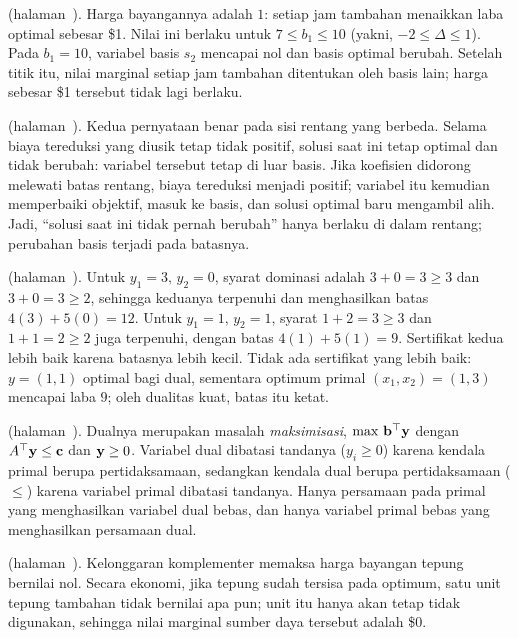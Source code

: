 


\medskip

\noindent\textbf{} (halaman~\pageref{lc:shadow-price-b1}).
Harga bayangannya adalah $1$: setiap jam tambahan menaikkan laba optimal sebesar
\$1. Nilai ini berlaku untuk $7 \le b_1 \le 10$ (yakni,
$-2 \le \Delta \le 1$). Pada $b_1=10$, variabel basis $s_2$ mencapai nol dan
basis optimal berubah. Setelah titik itu, nilai marginal setiap jam tambahan
ditentukan oleh basis lain; harga sebesar \$1 tersebut tidak lagi berlaku.

\medskip

\noindent\textbf{} (halaman~\pageref{lc:nonbasic-cost}).
Kedua pernyataan benar pada sisi rentang yang berbeda. Selama biaya tereduksi
yang diusik tetap tidak positif, solusi saat ini tetap optimal dan tidak
berubah: variabel tersebut tetap di luar basis. Jika koefisien didorong melewati
batas rentang, biaya tereduksi menjadi positif; variabel itu kemudian
memperbaiki objektif, masuk ke basis, dan solusi optimal baru mengambil alih.
Jadi, ``solusi saat ini tidak pernah berubah'' hanya berlaku di dalam rentang;
perubahan basis terjadi pada batasnya.

\medskip

\noindent\textbf{} (halaman~\pageref{lc:duality-certificate}).
Untuk $y_1=3,\,y_2=0$, syarat dominasi adalah $3+0=3\geq3$ dan
$3+0=3\geq2$, sehingga keduanya terpenuhi dan menghasilkan batas
$4(3)+5(0)=12$. Untuk $y_1=1,\,y_2=1$, syarat $1+2=3\geq3$ dan
$1+1=2\geq2$ juga terpenuhi, dengan batas $4(1)+5(1)=9$. Sertifikat kedua
lebih baik karena batasnya lebih kecil. Tidak ada sertifikat yang lebih baik:
$y=(1,1)$ optimal bagi dual, sementara optimum primal
$(x_1,x_2)=(1,3)$ mencapai laba $9$; oleh dualitas kuat, batas itu ketat.

\medskip

\noindent\textbf{} (halaman~\pageref{lc:dual-forms}).
Dualnya merupakan masalah \emph{maksimisasi},
$\max\,\mathbf{b}^\top\mathbf{y}$ dengan $A^\top\mathbf{y}\leq\mathbf{c}$ dan $\mathbf{y}\geq0$. Variabel dual
dibatasi tandanya ($y_i\geq0$) karena kendala primal berupa pertidaksamaan,
sedangkan kendala dual berupa pertidaksamaan ($\leq$) karena variabel primal
dibatasi tandanya. Hanya persamaan pada primal yang menghasilkan variabel dual
bebas, dan hanya variabel primal bebas yang menghasilkan persamaan dual.

\medskip

\noindent\textbf{} (halaman~\pageref{lc:cs-leftover}).
Kelonggaran komplementer memaksa harga bayangan tepung bernilai nol. Secara
ekonomi, jika tepung sudah tersisa pada optimum, satu unit tepung tambahan tidak
bernilai apa pun; unit itu hanya akan tetap tidak digunakan, sehingga nilai
marginal sumber daya tersebut adalah \$0.
